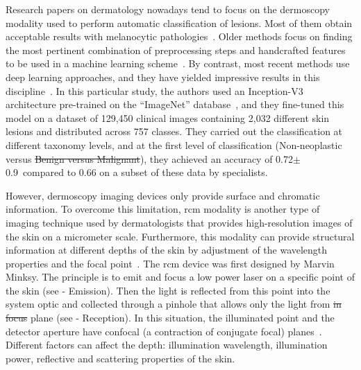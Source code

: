 \documentclass[journal,article,accept,moreauthors,pdftex, applsci]{Definitions/mdpi}
\providecommand{\DIFadd}[1]{{\protect\color{blue}\uwave{#1}}} %
\providecommand{\DIFdel}[1]{{\protect\color{red}\sout{#1}}}                      %
\providecommand{\DIFaddbegin}{} %
\providecommand{\DIFaddend}{} %
\providecommand{\DIFdelbegin}{} %
\providecommand{\DIFdelend}{} %
\begin{document}
Research papers on dermatology nowadays tend to focus on the dermoscopy modality used to perform automatic classification of lesions. Most of them obtain acceptable results with melanocytic pathologies~\cite{Iyatomi2010}. Older methods focus on finding the most pertinent combination of preprocessing steps and handcrafted features to be used in a machine learning scheme~\cite{Rastgoo2015,Pathan2018}. By contrast, most recent methods use deep learning approaches, and they have yielded impressive results in this discipline~\cite{Esteva2017}. In this particular study, the authors used an Inception-V3 architecture pre-trained on the “ImageNet” database~\cite{Deng2008}, and they fine-tuned this model on a dataset of 129,450 clinical images containing 2,032 different skin lesions and distributed across 757 classes. They carried out the classification at different taxonomy levels, and at the first level of classification (Non-neoplastic versus \DIFdelbegin \DIFdel{Benign versus Malignant}\DIFdelend \DIFaddbegin \DIFadd{benign versus malignant}\DIFaddend ), they achieved an accuracy of 0.72$\pm$0.9\ compared to 0.66 on a subset of these data by specialists.\par
However, dermoscopy imaging devices only provide surface and chromatic information. To overcome this limitation, \ac{rcm} modality is another type of imaging technique used by dermatologists that provides high-resolution images of the skin on a micrometer scale. Furthermore, this modality can provide structural information at different depths of the skin by adjustment of the wavelength properties and the focal point~\cite{Kolm2012}. The \ac{rcm} device was first designed by Marvin Minksy. The principle is to emit and focus a low power laser on a specific point of the skin (see  - Emission). Then the light is reflected from this point into the system optic and collected through a pinhole that allows only the light from \DIFdelbegin \DIFdel{in focus }\DIFdelend \DIFaddbegin \DIFadd{the in-focus }\DIFaddend plane (see  - Reception). In this situation, the illuminated point and the detector aperture have confocal (a contraction of conjugate focal) planes~\cite{Nehal2008a}. Different factors can affect the depth: illumination wavelength, illumination power, reflective and scattering properties of the skin.\par
\end{document}
